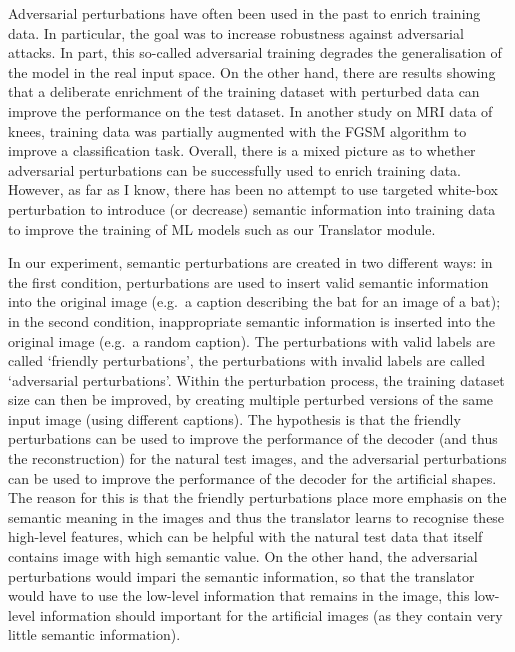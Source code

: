 Adversarial perturbations have often been used in the past to enrich training data\cite{goodfellowExplainingHarnessingAdversarial2014,madryDeepLearningModels2019}. In particular, the goal was to increase robustness against adversarial attacks. In part, this so-called adversarial training degrades the generalisation of the model in the real input space\cite{kurakinAdversarialMachineLearning2017}. On the other hand, there are results showing that a deliberate enrichment of the training dataset with perturbed data can improve the performance on the test dataset\cite{xieAdversarialExamplesImprove2020}.  In another study on MRI data of knees, training data was partially augmented with the FGSM algorithm to improve a classification task\cite{yanEnhancingClassificationPerformance2023}. Overall, there is a mixed picture as to whether adversarial perturbations can be successfully used to enrich training data. However, as far as I know, there has been no attempt to use targeted white-box perturbation to introduce (or decrease) semantic information into training data to improve the training of ML models such as our Translator module. 


In our experiment, semantic perturbations are created in two different ways: in the first condition, perturbations are used to insert valid semantic information into the original image (e.g.\ a caption describing the bat for an image of a bat); in the second condition, inappropriate semantic information is inserted into the original image (e.g.\ a random caption). The perturbations with valid labels are called `friendly perturbations', the perturbations with invalid labels are called `adversarial perturbations'. Within the perturbation process, the training dataset size can then be improved, by creating multiple perturbed versions of the same input image (using different captions). The  hypothesis is that the friendly perturbations can be used to improve the performance of the decoder (and thus the reconstruction) for the natural test images, and the adversarial perturbations can be used to improve the performance of the decoder for the artificial shapes. The reason for this is that the friendly perturbations place more emphasis on the semantic meaning in the images and thus the translator learns to recognise these high-level features, which can be helpful with the natural test data that itself contains image with high semantic value. On the other hand, the adversarial perturbations would impari the semantic information, so that the translator would have to use the low-level information that remains in the image, this low-level information should important for the artificial images (as they contain very little semantic information).


